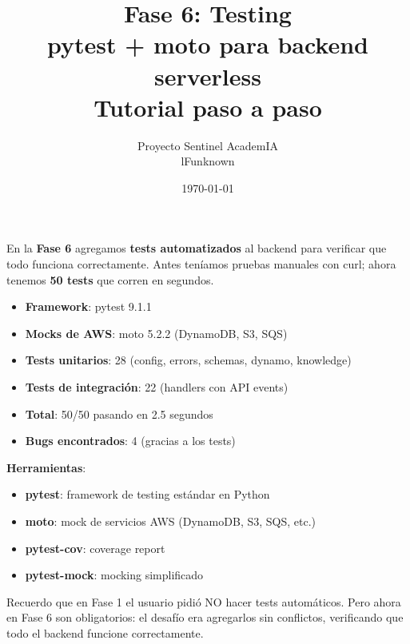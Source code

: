 \documentclass[11pt,a4paper,oneside]{article}
\title{\Huge\textbf{Fase 6: Testing} \\[0.3em]
       \Large pytest + moto para backend serverless \\[0.5em]
       \normalsize Tutorial paso a paso}
\author{Proyecto Sentinel AcademIA \\ \small lFunknown}
\date{\today}
\begin{document}
\maketitle
\thispagestyle{empty}

\begin{tcolorbox}[colback=blue!5!white,colframe=infoblue,title={\textbf{¿Qué construimos en este tutorial?}}]
En la \textbf{Fase 6} agregamos \textbf{tests automatizados} al backend para verificar que todo funciona correctamente. Antes ten\'iamos pruebas manuales con curl; ahora tenemos \textbf{50 tests} que corren en segundos.

\begin{itemize}
  \item \textbf{Framework}: pytest 9.1.1
  \item \textbf{Mocks de AWS}: moto 5.2.2 (DynamoDB, S3, SQS)
  \item \textbf{Tests unitarios}: 28 (config, errors, schemas, dynamo, knowledge)
  \item \textbf{Tests de integraci\'on}: 22 (handlers con API events)
  \item \textbf{Total}: 50/50 pasando en 2.5 segundos
  \item \textbf{Bugs encontrados}: 4 (gracias a los tests)
\end{itemize}

\textbf{Herramientas}:
\begin{itemize}
  \item \textbf{pytest}: framework de testing est\'andar en Python
  \item \textbf{moto}: mock de servicios AWS (DynamoDB, S3, SQS, etc.)
  \item \textbf{pytest-cov}: coverage report
  \item \textbf{pytest-mock}: mocking simplificado
\end{itemize}
\end{tcolorbox}

\begin{tcolorbox}[colback=warnorange!5!white,colframe=warnorange,title={\textbf{El usuario dijo "no test" en Fase 1\ldots}}]
Recuerdo que en Fase 1 el usuario pidi\'o NO hacer tests autom\'aticos. Pero ahora en Fase 6 son obligatorios: el desaf\'io era agregarlos sin conflictos, verificando que todo el backend funcione correctamente.
\end{tcolorbox}

\tableofcontents
\newpage

\end{document}
